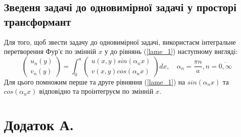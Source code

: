 \documentclass[a4paper,14pt]{extarticle}
\numberwithin{equation}{section}
\begin{document}
\subsection{Зведеня задачі до одновимірної задачі у просторі трансформант}
Для того, щоб звести задачу до одновимірної задачі, використаєм інтегральне перетворення Фур'є по змінній $x$ у до рівнянь (\ref{lame_1}) наступному вигляді:
\begin{equation}
    \begin{pmatrix}
        u_n(y) \\
        v_n(y)
    \end{pmatrix} = \int_{0}^{a} 
    \begin{pmatrix}
        u(x,y) sin(\alpha_n x) \\
        v(x,y) cos(\alpha_n x)
    \end{pmatrix} dx, \quad \alpha_n = \frac{\pi n}{a}, n=\overline{0, \infty}
\end{equation}
Для цього помножим перше та друге рівняння (\ref{lame_1}) на $sin(\alpha_n x)$ та $cos(\alpha_n x)$ відповідно та проінтегруєм по змінній $x$.

\section{Додаток А. }
\end{document}
